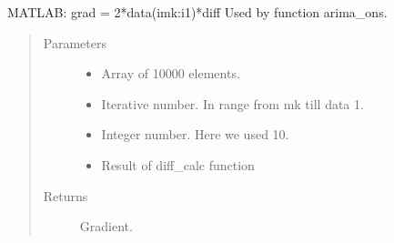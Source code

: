 \documentclass[letterpaper,10pt,english]{sphinxmanual}
\begin{document}
\begin{fulllineitems}
\label{\detokenize{LDS:LDS.OnlineLDS_library.grad_calc}}
\sphinxAtStartPar
MATLAB: grad = 2*data(i\sphinxhyphen{}mk:i\sphinxhyphen{}1)*diff
Used by function arima\_ons.
\begin{quote}\begin{description}
\item[{Parameters}] \leavevmode\begin{itemize}
\item {} 
\sphinxAtStartPar
{} \textendash{} Array of 10000 elements.

\item {} 
\sphinxAtStartPar
{} \textendash{} Iterative number. In range from mk till data \sphinxhyphen{} 1.

\item {} 
\sphinxAtStartPar
{} \textendash{} Integer number. Here we used 10.

\item {} 
\sphinxAtStartPar
{} \textendash{} Result of diff\_calc function

\end{itemize}

\item[{Returns}] \leavevmode
\sphinxAtStartPar
Gradient.

\end{description}\end{quote}

\end{fulllineitems}

\end{document}
